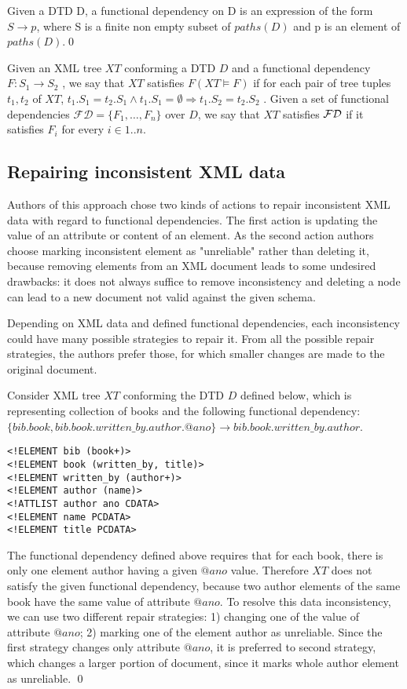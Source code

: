 \begin{define}
Given a DTD D, a functional dependency on D is an expression of the form $S \rightarrow p$, where S is a finite non empty subset of $paths(D)$ and p is an element of $paths(D)$.\qed
\end{define}

Given an XML tree $XT$ conforming a DTD $D$ and a functional dependency $F : S_1 \rightarrow S_2$ , we say that $XT$ satisfies $F (XT \models F )$ if for each pair of tree tuples $t_1, t_2$ of $XT$, $t_1.S_1 = t_2.S_1 \land t_1.S_1 = \emptyset \Rightarrow t_1.S_2 = t_2.S_2$ . Given a set of functional dependencies $\mathcal{FD} = \{F_1 , \dots, F_n\}$ over $D$, we say that $XT$ satisfies $\cal FD$ if it satisfies $F_i$ for every $i \in 1..n$.

\subsection{Repairing inconsistent XML data}

Authors of this approach chose two kinds of actions to repair inconsistent XML data with regard to functional dependencies. The first action is updating the value of an attribute or content of an element. As the second action authors choose marking inconsistent element as "unreliable" rather than deleting it, because removing elements from an XML document leads to some undesired drawbacks: it does not always suffice to remove inconsistency and deleting a node can lead to a new document not valid against the given schema.

Depending on XML data and defined functional dependencies, each inconsistency could have many possible strategies to repair it. From all the possible repair strategies, the authors prefer those, for which smaller changes are made to the original document.

\begin{example}
Consider XML tree $XT$ conforming the DTD $D$ defined below, which is representing collection of books and the following functional dependency:\\ $\{bib.book, bib.book.written\_by.author.@ano\} \rightarrow bib.book.written\_by.author$.
\begin{verbatim}
<!ELEMENT bib (book+)>
<!ELEMENT book (written_by, title)>
<!ELEMENT written_by (author+)>
<!ELEMENT author (name)>
<!ATTLIST author ano CDATA>
<!ELEMENT name PCDATA>
<!ELEMENT title PCDATA>
\end{verbatim}
The functional dependency defined above requires that for each book, there is only one element author having a given $@ano$ value. Therefore $XT$ does not satisfy the given functional dependency, because two author elements of the same book have the same value of attribute $@ano$. To resolve this data inconsistency, we can use two different repair strategies: 1) changing one of the value of attribute $@ano$; 2) marking one of the element author as unreliable. Since the first strategy changes only attribute $@ano$, it is preferred to second strategy, which changes a larger portion of document, since it marks whole author element as unreliable.
\qed
\end{example}


